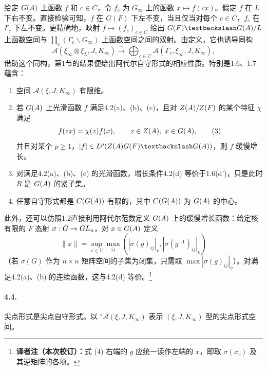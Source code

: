 给定 $G(A)$ 上函数 $f$ 和 $c\in C$，令 $f_c$ 为 $G_\infty$ 上的函数 $x\mapsto f(cx)$。假定 $f$ 在 $L$ 下右不变。直接检验可知，$f$ 在 $G(F)$ 下左不变，当且仅当对每个 $c\in C$，$f_c$ 在 $\Gamma_c$ 下左不变。更精确地，映射 $f\mapsto(f_c)_{c\in C}$ 给出 $G(F)\backslash G(\A)/L$ 上函数空间与 $\coprod_c(\Gamma_c\backslash G_\infty)$ 上函数空间之间的双射。由定义，它也诱导同构
\[
\mathcal A(\xi_\infty\otimes\xi_L,J,K_\infty)\xrightarrow{\sim}
\bigoplus_{c\in C}\mathcal A(\Gamma_c,\xi_\infty,J,K_\infty),\tag{2}
\]
借助这个同构，第1节的结果便给出阿代尔自守形式的相应性质。特别是1.6、1.7 蕴含：
\begin{enumerate}
\item[(i)] 空间 $\mathcal A(\xi,J,K_\infty)$ 有限维。
\item[(ii)] 若 $G(A)$ 上光滑函数 $f$ 满足4.2(a)、(b)、(c)，且对 $Z(A)/Z(F)$ 的某个特征 $\chi$ 满足
\[
f(zx)=\chi(z)f(x),\qquad z\in Z(\A),\ x\in G(\A),\tag{3}
\]
并且对某个 $p\geq1$，$|f|\in L^p(Z(\A)G(F)\backslash G(\A))$，则 $f$ 缓慢增长。
\item[(iii)] 对满足4.2(a)、(b)、(c) 的光滑函数，增长条件4.2(d) 等价于1.6(d')，只是此时 $R$ 是 $G(A)$ 的紧子集。
\item[(iv)] 任意自守形式都是 $C(G(A))$ 有限的，其中 $C(G(A))$ 为 $G(A)$ 的中心。
\end{enumerate}
此外，还可以仿照1.2直接利用阿代尔范数定义 $G(A)$ 上的缓慢增长函数：给定核有限的 $F$ 态射 $\sigma:G\to GL_n$，对 $x\in G(A)$ 定义
\[
\|x\|=\sup_{v\in V}\max_{ij}(|\sigma(g)_{ij}|_v,|\sigma(g^{-1})_{ij}|_v)\tag{4}
\]
（若 $\sigma(G)$ 作为 $n\times n$ 矩阵空间的子集为闭集，只需取 $\max|\sigma(g)_{ij}|_v$）。对满足4.2(a)、(b) 的连续函数，这与4.2(d) 等价。\footnote{\textbf{译者注（本次校订）：}式 (4) 右端的 $g$ 应统一读作左端的 $x$，即取 $\sigma(x_v)$ 及其逆矩阵的各项。}
\paragraph*{4.4.}
尖点形式是尖点自守形式。以 $^\circ\mathcal A(\xi,J,K_\infty)$ 表示 $(\xi,J,K_\infty)$ 型的尖点形式空间。

